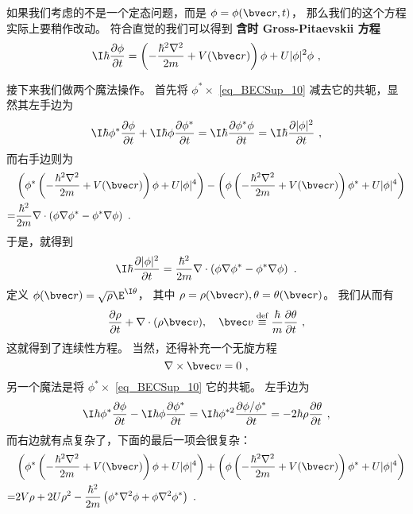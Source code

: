 如果我们考虑的不是一个定态问题，而是 $\phi = \phi({\bvec r},t)$， 那么我们的这个方程实际上要稍作改动。 符合直觉的我们可以得到 \textbf{含时 Gross-Pitaevskii 方程}
\begin{equation}\label{eq_BECSup_10}
\I\hbar\frac{\partial\phi}{\partial t} = \left(-\frac{\hbar^2\nabla^2}{2m}+V({\bvec r})\right)\phi + U|\phi|^2\phi~,
\end{equation}

接下来我们做两个魔法操作。 首先将 $\phi^*\times$ \autoref{eq_BECSup_10} 减去它的共轭，显然其左手边为
\begin{equation}
\I\hbar\phi^*\frac{\partial\phi}{\partial t} + \I\hbar\phi\frac{\partial\phi^*}{\partial t} = \I\hbar\frac{\partial\phi^*\phi}{\partial t} = \I\hbar\frac{\partial|\phi|^2}{\partial t}~,
\end{equation}
而右手边则为
\begin{equation}
\begin{split}
&\left(\phi^* \left(-\frac{\hbar^2\nabla^2}{2m}+V({\bvec r})\right)\phi + U|\phi|^4\right) -\left(\phi \left(-\frac{\hbar^2\nabla^2}{2m}+V({\bvec r})\right)\phi^* + U|\phi|^4\right) \\
=& \frac{\hbar^2}{2m}\nabla\cdot\left(\phi\nabla\phi^* - \phi^*\nabla\phi\right)~.
\end{split}
\end{equation}
于是，就得到
\[\I\hbar\frac{\partial|\phi|^2}{\partial t} = \frac{\hbar^2}{2m}\nabla\cdot\left(\phi\nabla\phi^* - \phi^*\nabla\phi\right) ~.\]
定义 $\phi({\bvec r}) = \sqrt{\rho}\E^{\I\theta}$， 其中 $\rho = \rho({\bvec r}),\theta = \theta({\bvec r})$。
我们从而有
\begin{equation}\frac{\partial\rho}{\partial t} + \nabla\cdot(\rho{\bvec v}),\quad {\bvec v}\overset{\text{def}}{\equiv}\frac{\hbar}{m}\frac{\partial\theta}{\partial t}~, \end{equation}
这就得到了连续性方程。 当然，还得补充一个无旋方程
\begin{equation}
\nabla\times{\bvec v}=0~,
\end{equation}
另一个魔法是将 $\phi^*\times$ \autoref{eq_BECSup_10} %
它的共轭。 左手边为
\begin{equation}
\I\hbar\phi^*\frac{\partial\phi}{\partial t} - \I\hbar\phi\frac{\partial\phi^*}{\partial t} = \I\hbar\phi^{*2}\frac{\partial \phi/\phi^*}{\partial t} = -2\hbar\rho\frac{\partial\theta}{\partial t}~,
\end{equation}
而右边就有点复杂了，下面的最后一项会很复杂：
\begin{equation}
\begin{split}
&\left(\phi^* \left(-\frac{\hbar^2\nabla^2}{2m}+V({\bvec r})\right)\phi + U|\phi|^4\right) + \left(\phi \left(-\frac{\hbar^2\nabla^2}{2m}+V({\bvec r})\right)\phi^* + U|\phi|^4\right) \\
=& 2V\rho + 2U\rho^2 - \frac{\hbar^2}{2m}\left(\phi^*\nabla^2\phi + \phi\nabla^2\phi^*\right)~.
\end{split}
\end{equation}

